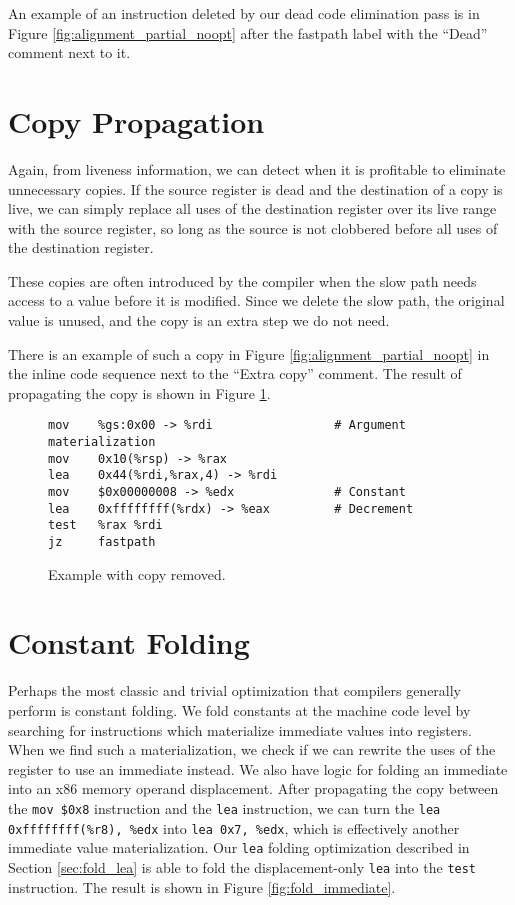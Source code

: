 An example of an instruction deleted by our dead code elimination pass is in
Figure \ref{fig:alignment_partial_noopt} after the fastpath label with the ``Dead''
comment next to it.

\section{Copy Propagation}

Again, from liveness information, we can detect when it is profitable to
eliminate unnecessary copies.  If the source register is dead and the
destination of a copy is live, we can simply replace all uses of the destination
register over its live range with the source register, so long as the source is
not clobbered before all uses of the destination register.

These copies are often introduced by the compiler when the slow path needs
access to a value before it is modified.  Since we delete the slow path, the
original value is unused, and the copy is an extra step we do not need.

There is an example of such a copy in Figure \ref{fig:alignment_partial_noopt} in
the inline code sequence next to the ``Extra copy'' comment.  The result of
propagating the copy is shown in Figure \ref{fig:copy_propagation}.

\begin{figure}
\begin{verbatim}
mov    %gs:0x00 -> %rdi                 # Argument materialization
mov    0x10(%rsp) -> %rax
lea    0x44(%rdi,%rax,4) -> %rdi
mov    $0x00000008 -> %edx              # Constant
lea    0xffffffff(%rdx) -> %eax         # Decrement
test   %rax %rdi
jz     fastpath
\end{verbatim}
\caption{Example with copy removed.}
\label{fig:copy_propagation}
\end{figure}

\section{Constant Folding}

Perhaps the most classic and trivial optimization that compilers generally
perform is constant folding.  We fold constants at the machine code level by
searching for instructions which materialize immediate values into registers.
When we find such a materialization, we check if we can rewrite the uses of the
register to use an immediate instead.  We also have logic for folding an
immediate into an x86 memory operand displacement.  After propagating the copy
between the {\tt mov \$0x8} instruction and the {\tt lea} instruction, we can
turn the {\tt lea 0xffffffff(\%r8), \%edx} into {\tt lea 0x7, \%edx}, which is
effectively another immediate value materialization.  Our {\tt lea} folding
optimization described in Section \ref{sec:fold_lea} is able to fold the
displacement-only {\tt lea} into the {\tt test} instruction.  The result is
shown in Figure \ref{fig:fold_immediate}.

